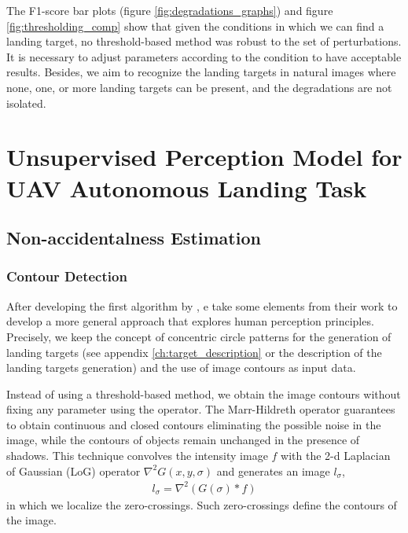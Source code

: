The F1-score bar plots (figure \ref{fig:degradations_graphs}) and figure \ref{fig:thresholding_comp} show that given the conditions in which we can find a landing target, no threshold-based method was robust to the set of perturbations. It is necessary to adjust parameters according to the condition to have acceptable results. Besides, we aim to recognize the landing targets in natural images where none, one, or more landing targets can be present, and the degradations are not isolated.

\section{Unsupervised Perception Model for UAV Autonomous Landing Task}\label{sec:unsupervised_perception_model}
%
\subsection{Non-accidentalness Estimation}\label{subsec:Helmholtz}

\subsubsection{Contour Detection}\label{subsubsec:muiltiscale}

After developing the first algorithm by \citep{BaquedanoA.:ESIEE:2017}, e take some elements from their work to develop a more general approach that explores human perception principles. Precisely, we keep the concept of concentric circle patterns for the generation of landing targets (see appendix  \ref{ch:target_description} or the description of the landing targets generation) and the use of image contours as input data.

Instead of using a threshold-based method, we obtain the image contours without fixing any parameter using the \cite{Marr.Hildreth:PRS:1980} operator. The Marr-Hildreth operator guarantees to obtain continuous and closed contours eliminating the possible noise in the image, while the contours of objects remain unchanged in the presence of shadows. This technique convolves the intensity image $f$ with the 2-d Laplacian of Gaussian (LoG) operator $\nabla^{2} G(x, y,\sigma)$ and generates an image $l_\sigma$, 
\begin{eqnarray}\label{eq:LoG}
l_\sigma =  \nabla^{2} (G(\sigma)\ast f)
\end{eqnarray}
in which we localize the zero-crossings. Such zero-crossings define the contours of the image.

